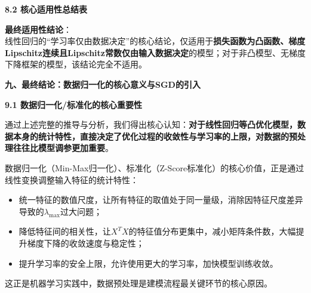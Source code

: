 \documentclass[10pt]{article}
\numberwithin{equation}{section}
\theoremstyle{plain}
\theoremstyle{definition}
\theoremstyle{remark}
\begin{document}
{\par\vspace{0.8ex}\noindent\normalsize\bfseries\color{accentD} 8.2 核心适用性总结表\par}
\begin{center}
\renewcommand{\arraystretch}{1.3}
\end{center}
\textbf{最终适用性结论}：\\
线性回归的“学习率仅由数据决定”的核心结论，仅适用于\textbf{损失函数为凸函数、梯度Lipschitz连续且Lipschitz常数仅由输入数据决定}的模型；对于非凸模型、无梯度下降框架的模型，该结论完全不适用。

{\par\vspace{1ex}\noindent\large\bfseries\color{brandD} 九、最终结论：数据归一化的核心意义与SGD的引入\par}
{\par\vspace{0.8ex}\noindent\normalsize\bfseries\color{accentD} 9.1 数据归一化/标准化的核心重要性\par}
通过上述完整的推导与分析，我们得出核心认知：\textbf{对于线性回归等凸优化模型，数据本身的统计特性，直接决定了优化过程的收敛性与学习率的上限，对数据的预处理往往比模型调参更加重要}。

数据归一化（Min-Max归一化）、标准化（Z-Score标准化）的核心价值，正是通过线性变换调整输入特征的统计特性：
\begin{itemize}[leftmargin=*,nosep]
    \item 统一特征的数值尺度，让所有特征的取值处于同一量级，消除因特征尺度差异导致的$\lambda_{\text{max}}$过大问题；
    \item 降低特征间的相关性，让$X^T X$的特征值分布更集中，减小矩阵条件数，大幅提升梯度下降的收敛速度与稳定性；
    \item 提升学习率的安全上限，允许使用更大的学习率，加快模型训练收敛。
\end{itemize}
这正是机器学习实践中，数据预处理是建模流程最关键环节的核心原因。
\end{document}
